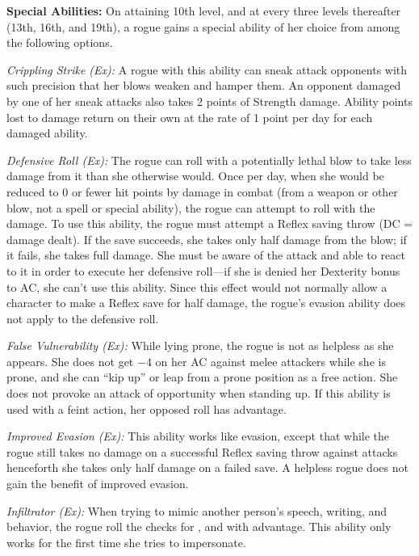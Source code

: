 \textbf{Special Abilities:} On attaining 10th level, and at every three levels thereafter (13th, 16th, and 19th), a rogue gains a special ability of her choice from among the following options.

\textit{Crippling Strike (Ex):} A rogue with this ability can sneak attack opponents with such precision that her blows weaken and hamper them. An opponent damaged by one of her sneak attacks also takes 2 points of Strength damage. Ability points lost to damage return on their own at the rate of 1 point per day for each damaged ability.

\textit{Defensive Roll (Ex):} The rogue can roll with a potentially lethal blow to take less damage from it than she otherwise would. Once per day, when she would be reduced to 0 or fewer hit points by damage in combat (from a weapon or other blow, not a spell or special ability), the rogue can attempt to roll with the damage. To use this ability, the rogue must attempt a Reflex saving throw (DC = damage dealt). If the save succeeds, she takes only half damage from the blow; if it fails, she takes full damage. She must be aware of the attack and able to react to it in order to execute her defensive roll---if she is denied her Dexterity bonus to AC, she can't use this ability. Since this effect would not normally allow a character to make a Reflex save for half damage, the rogue's evasion ability does not apply to the defensive roll.


\textit{False Vulnerability (Ex):} While lying prone, the rogue is not as helpless as she appears. She does not get $-4$ on her AC against melee attackers while she is prone, and she can ``kip up'' or leap from a prone position as a free action. She does not provoke an attack of opportunity when standing up. If this ability is used with a feint action, her opposed  roll has advantage.

\textit{Improved Evasion (Ex):} This ability works like evasion, except that while the rogue still takes no damage on a successful Reflex saving throw against attacks henceforth she takes only half damage on a failed save. A helpless rogue does not gain the benefit of improved evasion.

\textit{Infiltrator (Ex):} When trying to mimic another person's speech, writing, and behavior, the rogue roll the checks for ,  and  with advantage. This ability only works for the first time she tries to impersonate.

